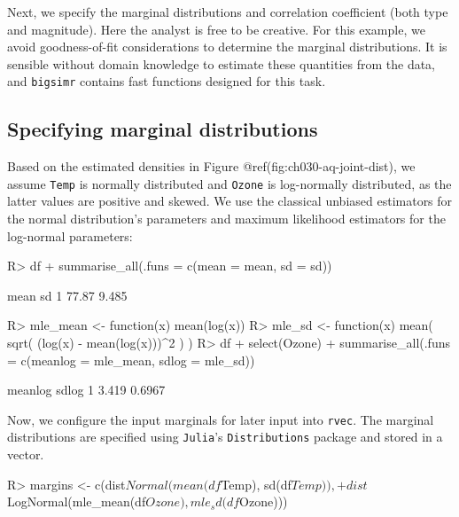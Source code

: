 \documentclass[
]{jss}
\begin{document}
Next, we specify the marginal distributions and correlation coefficient
(both type and magnitude). Here the analyst is free to be creative. For
this example, we avoid goodness-of-fit considerations to determine the
marginal distributions. It is sensible without domain knowledge to
estimate these quantities from the data, and \texttt{bigsimr} contains
fast functions designed for this task.

\hypertarget{specifying-marginal-distributions}{%
\subsection{Specifying marginal
distributions}\label{specifying-marginal-distributions}}

Based on the estimated densities in Figure
@ref(fig:ch030-aq-joint-dist), we assume \texttt{Temp} is normally
distributed and \texttt{Ozone} is log-normally distributed, as the
latter values are positive and skewed. We use the classical unbiased
estimators for the normal distribution's parameters and maximum
likelihood estimators for the log-normal parameters:

\begin{CodeChunk}
\begin{CodeInput}
R> df %
+   summarise_all(.funs = c(mean = mean, sd = sd))
\end{CodeInput}
\begin{CodeOutput}
   mean    sd
1 77.87 9.485
\end{CodeOutput}
\end{CodeChunk}

\begin{CodeChunk}
\begin{CodeInput}
R> mle_mean <- function(x) mean(log(x))
R> mle_sd <- function(x) mean( sqrt( (log(x) - mean(log(x)))^2 ) )
R> df %
+   select(Ozone) %
+   summarise_all(.funs = c(meanlog = mle_mean, sdlog = mle_sd))
\end{CodeInput}
\begin{CodeOutput}
  meanlog  sdlog
1   3.419 0.6967
\end{CodeOutput}
\end{CodeChunk}

Now, we configure the input marginals for later input into
\texttt{rvec}. The marginal distributions are specified using
\texttt{Julia}'s \texttt{Distributions} package and stored in a vector.

\begin{CodeChunk}
\begin{CodeInput}
R> margins <- c(dist$Normal(mean(df$Temp), sd(df$Temp)),
+              dist$LogNormal(mle_mean(df$Ozone), mle_sd(df$Ozone)))
\end{CodeInput}
\end{CodeChunk}
\end{document}
